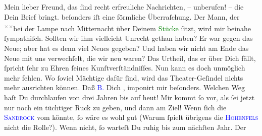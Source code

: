            \pstart\center{}Mein lieber Freund,\pend\pstart
           das ſind recht erfreuliche Nachrichten, – unberufen! – die Dein Brief bringt. \label{K_L02630-1v}\label{K_L02630-1h} beſonders iſt eine förmliche Überraſchung. Der Mann, der \substVorne{}\textsuperscript{\textcolor{gray}{×}\-\textcolor{gray}{×}}\substDazwischen{}bei\substHinten{} der Lampe nach Mitternacht über Deinem \textcolor{green}{Stücke}{} ſitzt, wird mir beinahe ſympathiſch.  Sollten wir ihm vielleicht Unrecht gethan haben? Er
               war gegen das Neue; aber hat es denn viel Neues gegeben? Und haben wir nicht am Ende
               das Neue mit uns verwechſelt, die wir neu waren? Das Urtheil, das er über Dich fällt,
               ſpricht ſehr zu Ehren {\pb}ſeines Kunſtverſtändniſſes.
               Nun kann es doch unmöglich mehr fehlen. Wo ſoviel Mächtige dafür ſind, wird das
               Theater-Geſindel nichts mehr ausrichten können. Daß \textcolor{blue}{B.}{}\ledrightnote{\textcolor{blue}{Max Eugen Burckhard}} Dich \label{K_L02630-2v}\label{K_L02630-2h}, imponirt mir beſonders. Welchen Weg haſt Du durchlaufen  von drei Jahren bis auf heut! Mir
               kommt ſo vor, als ſei jetzt nur noch ein tüchtiger Ruck zu geben, und dann am Ziel!
               Wenn ſich die \textsc{\textcolor{blue}{Sandrock}{}\ledrightnote{\textcolor{blue}{Adele Sandrock}}} vom \label{K_mets_Goldmann_94-partII-5v}\label{K_mets_Goldmann_94-partII-5h} könnte, ſo wäre es wohl gut (Warum ſpielt
               übrigens die \textsc{\textcolor{blue}{Hohenfels}{}\ledrightnote{\textcolor{blue}{Stella Hohenfels}}} nicht die Rolle?). Wenn nicht, ſo warteſt Du ruhig bis zum nächſten Jahr. Der
